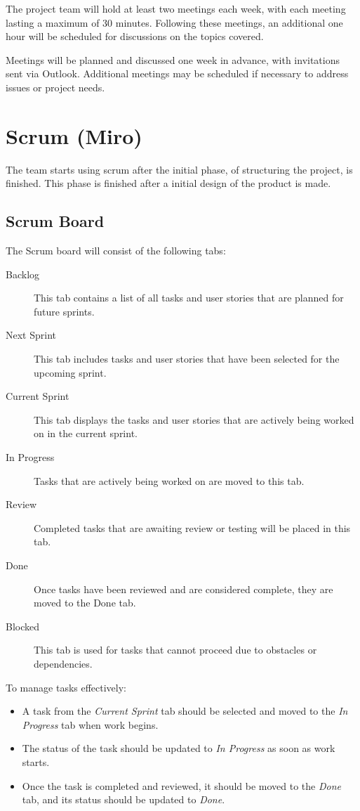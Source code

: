 \documentclass{projdoc}
\begin{document}
The project team will hold at least two meetings each week, with each meeting lasting
a maximum of 30 minutes. Following these meetings, an additional one hour will be
scheduled for discussions on the topics covered.

Meetings will be planned and discussed one week in advance, with invitations sent via
Outlook. Additional meetings may be scheduled if necessary to address issues or
project needs.

\section{Scrum (Miro)}

The team starts using scrum after the initial phase, of structuring the project, is finished. This phase is finished after a initial design of the product is made.

\subsection{Scrum Board}

The Scrum board \autocite{miro:scrum-board} will consist of the following tabs:

\begin{description}
	\item[Backlog] This tab contains a list of all tasks and user stories that are
		planned for future sprints.
	\item[Next Sprint] This tab includes tasks and user stories that have been selected
		for the upcoming sprint.
	\item[Current Sprint] This tab displays the tasks and user stories that are
		actively being worked on in the current sprint.
	\item[In Progress] Tasks that are actively being worked on are moved to this tab.
	\item[Review] Completed tasks that are awaiting review or testing will be placed in
		this tab.
	\item[Done] Once tasks have been reviewed and are considered complete, they are
		moved to the Done tab.
	\item [Blocked] This tab is used for tasks that cannot proceed due to obstacles or
		dependencies.
\end{description}

To manage tasks effectively:

\begin{itemize}
	\item A task from the \emph{Current Sprint} tab should be selected and moved to the
		\emph{In Progress} tab when work begins.
	\item The status of the task should be updated to \emph{In Progress} as soon as
		work starts.
	\item Once the task is completed and reviewed, it should be moved to the
		\emph{Done} tab, and its status should be updated to \emph{Done}.
\end{itemize}
\end{document}
